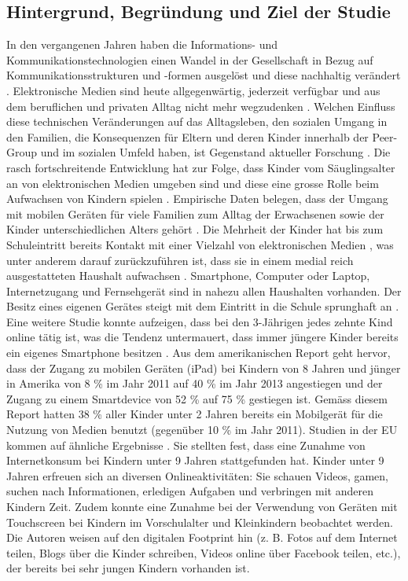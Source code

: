 \subsection{Hintergrund, Begründung und Ziel der Studie}\label{sec:Hintergrund}
In den vergangenen Jahren haben die Informations- und Kommunikationstechnologien einen Wandel in der Gesellschaft in Bezug auf Kommunikationsstrukturen und -formen ausgelöst und diese nachhaltig verändert \cite{Hasebrink2009, Bms2013}. Elektronische Medien sind heute allgegenwärtig, jederzeit verfügbar und aus dem beruflichen und privaten Alltag nicht mehr wegzudenken \cite{Bmfsfj2013}. Welchen Einfluss diese technischen Veränderungen auf das Alltagsleben, den sozialen Umgang in den Familien, die Konsequenzen für Eltern und deren Kinder innerhalb der Peer-Group und im sozialen Umfeld haben, ist Gegenstand aktueller Forschung \cite{Olafsson2014}. Die rasch fortschreitende Entwicklung hat zur Folge, dass Kinder vom Säuglingsalter an von elektronischen Medien umgeben sind und diese eine grosse Rolle beim Aufwachsen von Kindern spielen \cite{Feierabend2015, Divsi2015}. Empirische Daten belegen, dass der Umgang mit mobilen Geräten für viele Familien zum Alltag der Erwachsenen sowie der Kinder unterschiedlichen Alters gehört \cite{Wagner2016}. Die Mehrheit der Kinder hat bis zum Schuleintritt bereits Kontakt mit einer Vielzahl von elektronischen Medien \cite{Feierabend2015}, was unter anderem darauf zurückzuführen ist, dass sie in einem medial reich ausgestatteten Haushalt aufwachsen \cite{Suter2015}. Smartphone, Computer oder Laptop, Internetzugang und Fernsehgerät sind in nahezu allen Haushalten vorhanden. Der Besitz eines eigenen Gerätes steigt mit dem Eintritt in die Schule sprunghaft an \cite{Feierabend2015a}. Eine weitere Studie konnte aufzeigen, dass bei den 3-Jährigen jedes zehnte Kind online tätig ist, was die Tendenz untermauert, dass immer jüngere Kinder bereits ein eigenes Smartphone besitzen \cite{Divsi2015}. Aus dem amerikanischen Report  geht hervor, dass der Zugang zu mobilen Geräten (iPad) bei Kindern von 8 Jahren und jünger in Amerika von 8 \% im Jahr 2011 auf 40 \% im Jahr 2013 angestiegen und der Zugang zu einem Smartdevice von 52 \% auf 75 \% gestiegen ist. Gemäss diesem Report hatten 38 \% aller Kinder unter 2 Jahren bereits ein Mobilgerät für die Nutzung von Medien benutzt (gegenüber 10 \% im Jahr 2011). Studien in der EU kommen auf ähnliche Ergebnisse \cite{Holloway2013}. Sie stellten fest, dass eine Zunahme von Internetkonsum bei Kindern unter 9 Jahren stattgefunden hat. Kinder unter 9 Jahren erfreuen sich an diversen Online\-aktivitäten: Sie schauen Videos, gamen, suchen nach Informationen, erledigen Aufgaben
und verbringen mit anderen Kindern Zeit. Zudem konnte eine Zunahme bei der Verwendung von Geräten mit Touchscreen bei Kindern im Vorschulalter und Kleinkindern beobachtet werden. Die Autoren weisen auf den digitalen Footprint hin (z. B. Fotos auf dem Internet teilen, Blogs über die Kinder schreiben, Videos online über Facebook teilen, etc.), der bereits bei sehr jungen Kindern vorhanden ist.


